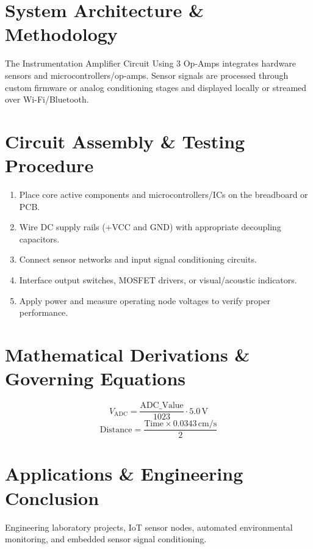 \documentclass[11pt,a4paper]{article}
\begin{document}
\section{System Architecture \& Methodology}
The Instrumentation Amplifier Circuit Using 3 Op-Amps integrates hardware sensors and microcontrollers/op-amps. Sensor signals are processed through custom firmware or analog conditioning stages and displayed locally or streamed over Wi-Fi/Bluetooth.

\section{Circuit Assembly \& Testing Procedure}
\begin{enumerate}
    \item Place core active components and microcontrollers/ICs on the breadboard or PCB.
    \item Wire DC supply rails (+VCC and GND) with appropriate decoupling capacitors.
    \item Connect sensor networks and input signal conditioning circuits.
    \item Interface output switches, MOSFET drivers, or visual/acoustic indicators.
    \item Apply power and measure operating node voltages to verify proper performance.
\end{enumerate}

\section{Mathematical Derivations \& Governing Equations}
\begin{equation}
V_{\text{ADC}} = \frac{\text{ADC\_Value}}{1023} \cdot 5.0\,\text{V}
\end{equation}
\begin{equation}
\text{Distance} = \frac{\text{Time} \times 0.0343\,\text{cm/s}}{2}
\end{equation}

\section{Applications \& Engineering Conclusion}
Engineering laboratory projects, IoT sensor nodes, automated environmental monitoring, and embedded sensor signal conditioning.
\end{document}

